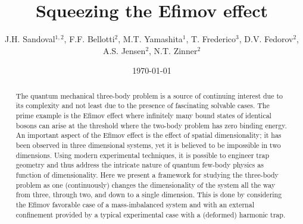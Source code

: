 \documentclass[twocolumn,showpacs,aps,prl,10pt]{revtex4}
\begin{document}
\title{Squeezing the Efimov effect}

\author{J.H. Sandoval$^{1,2}$, F.F. Bellotti$^{2}$, M.T. Yamashita$^{1}$,
  T. Frederico$^{3}$, D.V. Fedorov$^{2}$, A.S. Jensen$^{2}$, N.T. Zinner$^{2}$}






\date{\today }



\begin{abstract}
The quantum mechanical three-body problem is a source of continuing
interest due to its complexity and not least due to the presence of
fascinating solvable cases. The prime example is the Efimov effect
where infinitely many bound states of identical bosons can arise at
the threshold where the two-body problem has zero binding energy. An
important aspect of the Efimov effect is the effect of spatial
dimensionality; it has been observed in three dimensional systems, yet
it is believed to be impossible in two dimensions. Using modern
experimental techniques, it is possible to engineer trap geometry and
thus address the intricate nature of quantum few-body physics as
function of dimensionality. Here we present a
framework for studying the three-body problem as one (continuously)
changes the dimensionality of the system all the way from three,
through two, and down to a single dimension. This is done by
considering the Efimov favorable case of a mass-imbalanced system and
with an external confinement provided by a typical experimental case
with a (deformed) harmonic trap.
\end{abstract}


\maketitle
\end{document}
